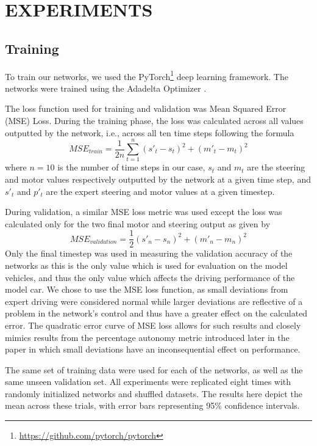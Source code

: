 \addtolength{\textheight}{-10pt}

\section{EXPERIMENTS}
\label{sec:experiments}

\subsection{Training}
To train our networks, we used the PyTorch\footnote{\url{https://github.com/pytorch/pytorch}} deep learning framework. The networks were trained using the Adadelta Optimizer \cite{DBLP:journals/corr/abs-1212-5701}.

The loss function used for training and validation was Mean Squared Error  (MSE) Loss. During the training phase, the loss was calculated across all values outputted by the network, i.e., across all ten time steps following the formula
\begin{equation} \label{eq:1}
MSE_{train} = \dfrac{1}{2n}\sum_{t=1}^{n}(s'_t -  s_t)^2 +(m'_t - m_t)^2 
\end{equation}
where $n=10$ is the number of time steps in our case, $s_t$  and $m_t$ are the steering and motor values respectively outputted by the network at a given time step, and $s'_t$ and $p'_t$ are the expert steering and motor values at a given timestep.

During validation, a similar MSE loss metric was used except the loss was calculated only for the two final motor and steering output as given by
\begin{equation} \label{eq:2}
MSE_{validation} = \dfrac{1}{2} (s'_n -  s_n)^2 +(m'_n - m_n)^2
\end{equation}
Only the final timestep was used in measuring the validation accuracy of the networks as this is the only value which is used for evaluation on the model vehicles, and thus the only value which affects the driving performance of the model car. We chose to use the MSE loss function, as small deviations from expert driving were considered normal while larger deviations are reflective of a problem in the network's control and thus have a greater effect on the calculated error. The quadratic error curve of MSE loss allows for such results and closely mimics results from the percentage autonomy metric introduced later in the paper in which small deviations have an inconsequential effect on performance.

The same set of training data were used for each of the networks, as well as the same unseen validation set. All experiments were replicated eight times with randomly initialized networks and shuffled datasets. The results here depict the mean across these trials, with error bars representing 95\% confidence intervals.


